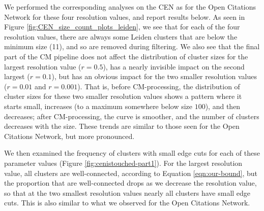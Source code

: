 \documentclass[11pt]{article}   	%
\begin{document}
We performed the corresponding analyses on the CEN as for the Open Citations Network for these four resolution values, and report results below.
As seen in Figure \ref{fig:CEN_size_count_plots_leiden}, we see that  for each of the four resolution values, there are always some Leiden clusters  that are below
the minimum size (11), and so are removed during filtering. We also see that  the final part of the CM pipeline does not affect the distribution of cluster sizes for the
largest resolution value ($r=0.5$), has a nearly invisible impact on the second largest ($r=0.1$), but has an obvious impact for the two smaller resolution values
($r=0.01$ and $r=0.001$).
That is, before CM-processing, the distribution of cluster sizes for these two smaller resolution values shows a pattern where it starts small, increases (to a maximum somewhere
below size $100$), and then decreases; after CM-processing, the curve is smoother, and the number of clusters  decreases with the size.
These trends are similar to those seen for the Open Citations Network, but more pronounced.

We then examined the frequency of   clusters with small edge cuts for each of these parameter values (Figure \ref{fig:cenistouched-part1}).
For the largest resolution value, all clusters are well-connected, according to Equation \ref{eqn:our-bound}, but the proportion that are well-connected drops as we decrease the resolution value, so that at the two smallest resolution values nearly all clusters have small edge cuts.
This is also similar to what we observed for the Open Citations Network.
\end{document}
